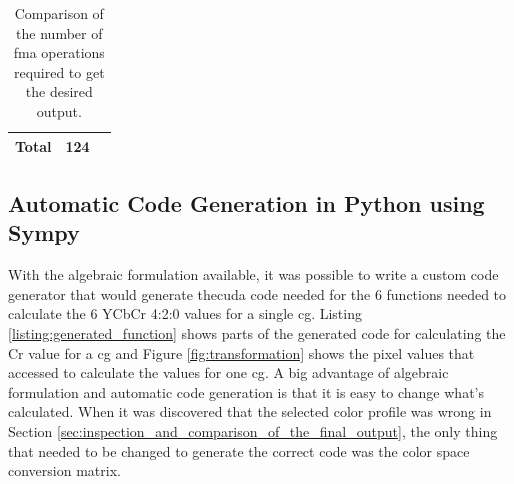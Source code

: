 \begin{table}
\begin{minipage}[b]{.5\linewidth}
{\begin{tabular}{|l|c| c|}
                \textbf{Total}                             & 124                                            \\
                \hline
            \end{tabular}}
    \end{minipage}
    \begin{minipage}[b]{.5\linewidth}
    \end{minipage}
    \caption{Comparison of the number of \gls{fma} operations required to get the desired output.}
    \label{table:debayer_coefficients}
\end{table}

\subsection{Automatic Code Generation in Python using Sympy}
\label{sec:code_generation}
With the algebraic formulation available, it was possible to write a custom code generator that would generate the\gls{cuda} code needed for the 6 functions needed to calculate the 6 YCbCr 4:2:0 values for a single \gls{cg}.
Listing \ref{listing:generated_function} shows parts of the generated code for calculating the Cr value for a \gls{cg} and Figure \ref{fig:transformation} shows the pixel values that accessed to calculate the values for one \gls{cg}.
A big advantage of algebraic formulation and automatic code generation is that it is easy to change what's calculated.
When it was discovered that the selected color profile was wrong in Section \ref{sec:inspection_and_comparison_of_the_final_output}, the only thing that needed to be changed to generate the correct code was the color space conversion matrix.

